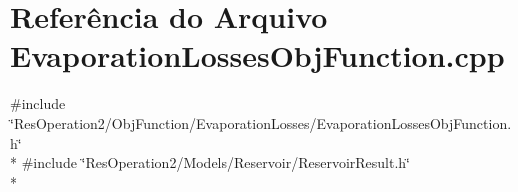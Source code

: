 \section{Referência do Arquivo Evaporation\+Losses\+Obj\+Function.\+cpp}
\label{_2_obj_function_2_evaporation_losses_2_evaporation_losses_obj_function_8cpp}
{\ttfamily \#include \char`\"{}Res\+Operation2/\+Obj\+Function/\+Evaporation\+Losses/\+Evaporation\+Losses\+Obj\+Function.\+h\char`\"{}}\\*
{\ttfamily \#include \char`\"{}Res\+Operation2/\+Models/\+Reservoir/\+Reservoir\+Result.\+h\char`\"{}}\\*
